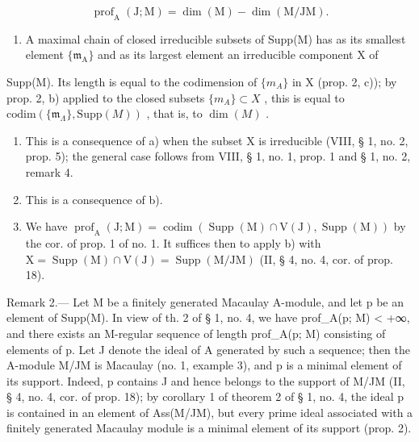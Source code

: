 \[
\operatorname{prof} _ {\mathrm{A}} (\mathrm{J}; \mathrm{M}) = \dim (\mathrm{M}) - \dim (\mathrm{M} / \mathrm{JM}).
\]

\begin{enumerate}
\def\labelenumi{\alph{enumi})}
\tightlist
\item
  A maximal chain of closed irreducible subsets of Supp(M) has as its smallest element \(\{\mathfrak{m}_{\mathrm{A}}\}\) and as its largest element an irreducible component X of
\end{enumerate}

Supp(M). Its length is equal to the codimension of \(\{m_{A}\}\) in X (prop. 2, c)); by prop. 2, b) applied to the closed subsets \(\{m_{A}\}\subset X\) , this is equal to \(\text{codim}(\{\mathfrak{m}_{\Lambda}\},\text{Supp}(M))\) , that is, to \(\dim(M)\) .

\begin{enumerate}
\def\labelenumi{\alph{enumi})}
\setcounter{enumi}{1}
\item
  This is a consequence of a) when the subset X is irreducible (VIII, § 1, no. 2, prop. 5); the general case follows from VIII, § 1, no. 1, prop. 1 and § 1, no. 2, remark 4.
\item
  This is a consequence of b).
\item
  We have \(\operatorname{prof}_{\mathrm{A}}(\mathrm{J};\mathrm{M}) = \operatorname{codim}(\operatorname{Supp}(\mathrm{M})\cap \mathrm{V}(\mathrm{J}),\operatorname{Supp}(\mathrm{M}))\) by the cor. of prop. 1 of no. 1. It suffices then to apply b) with \(\mathrm{X} = \operatorname{Supp}(\mathrm{M})\cap \mathrm{V}(\mathrm{J}) = \operatorname{Supp}(\mathrm{M} / \mathrm{JM})\) (II, § 4, no. 4, cor. of prop. 18).
\end{enumerate}

Remark 2.--- Let M be a finitely generated Macaulay A-module, and let p be an element of Supp(M). In view of th. 2 of § 1, no. 4, we have prof\_A(p; M) \textless{} +∞, and there exists an M-regular sequence of length prof\_A(p; M) consisting of elements of p. Let J denote the ideal of A generated by such a sequence; then the A-module M/JM is Macaulay (no. 1, example 3), and p is a minimal element of its support. Indeed, p contains J and hence belongs to the support of M/JM (II, § 4, no. 4, cor. of prop. 18); by corollary 1 of theorem 2 of § 1, no. 4, the ideal p is contained in an element of Ass(M/JM), but every prime ideal associated with a finitely generated Macaulay module is a minimal element of its support (prop. 2).
